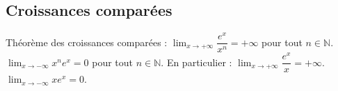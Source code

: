 \documentclass[11pt,a4paper]{article}
\begin{document}
\subsection{Croissances comparées}

\begin{boiteProp}{Théorème des croissances comparées :}
    $\displaystyle \lim_{x\to +\infty} \dfrac{e^x}{x^n} = +\infty$ pour tout $n\in\mathbb{N}$.
    \newline
    $\displaystyle \lim_{x\to -\infty} x^n e^x = 0$ pour tout $n\in\mathbb{N}$.
    \newline
    En particulier :
    \newline
    $\displaystyle \lim_{x\to +\infty} \dfrac{e^x}{x} = +\infty$.
    \newline
    $\displaystyle \lim_{x\to -\infty} x e^x = 0$.
\end{boiteProp}
\end{document}
